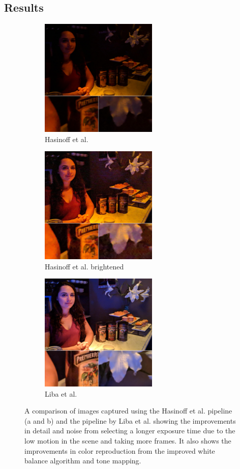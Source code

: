 \documentclass{sig-alternate}
\begin{document}
\subsection{Results}

\begin{figure}
\centering
\begin{subfigure}{2.2in}
\centering
\includegraphics[width=2.2in]{figures/liba2019-figure-1a-95quality.jpg}
\caption{Hasinoff et al.}
\label{fig:libaResults:hasinoff}
\end{subfigure}
\begin{subfigure}{2.2in}
\centering
\includegraphics[width=2.2in]{figures/liba2019-figure-1b-95quality.jpg}
\caption{Hasinoff et al. brightened}
\label{fig:libaResults:Hasinoff}
\end{subfigure}
\begin{subfigure}{2.2in}
\centering
\includegraphics[width=2.2in]{figures/liba2019-figure-1c-95quality.jpg}
\caption{Liba et al.}
\label{fig:libaResults:liba}
\end{subfigure}

\caption{A comparison of images captured using the Hasinoff et al. pipeline (a and b) and the pipeline by Liba et al. showing the improvements in detail and noise from selecting a longer exposure time due to the low motion in the scene and taking more frames. It also shows the improvements in color reproduction from the improved white balance algorithm and tone mapping.~\cite{Liba2019}}


\label{fig:libaResults}
\end{figure}
\end{document}
